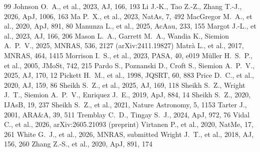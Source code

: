 \documentclass[twocolumn,twocolappendix]{openjournal}
\begin{document}
\begin{thebibliography}{99}
 Johnson O.~A., et al., 2023, AJ, 166, 193
 Li J.-K., Tao Z.-Z., Zhang T.-J., 2026, ApJ, 1006, 163
 Ma P.~X., et al., 2023, NatAs, 7, 492
 MacGregor M.~A., et al., 2020, ApJ, 891, 80
 Manunza L., et al., 2025, AcAau, 233, 155
 Margot J.-L., et al., 2023, AJ, 166, 206
 Mason L.~A., Garrett M.~A., Wandia K., Siemion A.~P.~V., 2025, MNRAS, 536, 2127 (arXiv:2411.19827)
 Matrà L., et al., 2017, MNRAS, 464, 1415
 Morrison I.~S., et al., 2023, PASA, 40, e019
 M\"uller H.~S.~P., et al., 2005, JMoSt, 742, 215
 Pardo S., Poznanski D., Croft S., Siemion A.~P.~V., 2025, AJ, 170, 12
 Pickett H.~M., et al., 1998, JQSRT, 60, 883
 Price D.~C., et al., 2020, AJ, 159, 86
 Sheikh S.~Z., et al., 2025, AJ, 169, 118
 Sheikh S.~Z., Wright J.~T., Siemion A.~P.~V., Enriquez J.~E., 2019, ApJ, 884, 14
 Sheikh S.~Z., 2020, IJAsB, 19, 237
 Sheikh S.~Z., et al., 2021, Nature Astronomy, 5, 1153
 Tarter J., 2001, ARA\&A, 39, 511
 Tremblay C.~D., Tingay S.~J., 2024, ApJ, 972, 76
 Vidal C., et al., 2026, arXiv:2605.21093 (preprint)
 Virtanen P., et al., 2020, NatMe, 17, 261
 White G.~J., et al., 2026, MNRAS, submitted
 Wright J.~T., et al., 2018, AJ, 156, 260
 Zhang Z.-S., et al., 2020, ApJ, 891, 174
\end{thebibliography}
\end{document}
